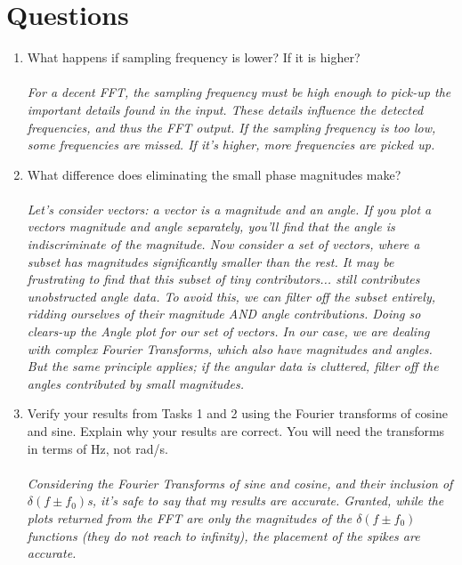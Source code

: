 \documentclass[12pt]{report}
\begin{document}
\section{Questions}
\begin{enumerate}
    \item What happens if sampling frequency is lower? If it is higher?\\~\\
    \textit{For a decent FFT, the sampling frequency must be high enough to pick-up the important details found in the input. These details influence the detected frequencies, and thus the FFT output. If the sampling frequency is too low, some frequencies are missed. If it's higher, more frequencies are picked up.}\\
    \item What difference does eliminating the small phase magnitudes make?\\~\\
    \textit{Let's consider vectors: a vector is a magnitude and an angle. If you plot a vectors magnitude and angle separately, you'll find that the angle is indiscriminate of the magnitude. Now consider a set of vectors, where a subset has magnitudes significantly smaller than the rest. It may be frustrating to find that this subset of tiny contributors... still contributes unobstructed angle data. To avoid this, we can filter off the subset entirely, ridding ourselves of their magnitude AND angle contributions. Doing so clears-up the Angle plot for our set of vectors. In our case, we are dealing with complex Fourier Transforms, which also have magnitudes and angles. But the same principle applies; if the angular data is cluttered, filter off the angles contributed by small magnitudes.}\\
    \item Verify your results from Tasks 1 and 2 using the Fourier transforms of cosine and sine. Explain why your results are correct. You will need the transforms in terms of Hz, not rad/s.\\~\\
    \textit{Considering the Fourier Transforms of sine and cosine, and their inclusion of $\delta (f \pm f_0)$s, it's safe to say that my results are accurate. Granted, while the plots returned from the FFT are only the magnitudes of the $\delta (f \pm f_0)$ functions (they do not reach to infinity), the placement of the spikes are accurate.}\\
\end{enumerate}
\end{document}
